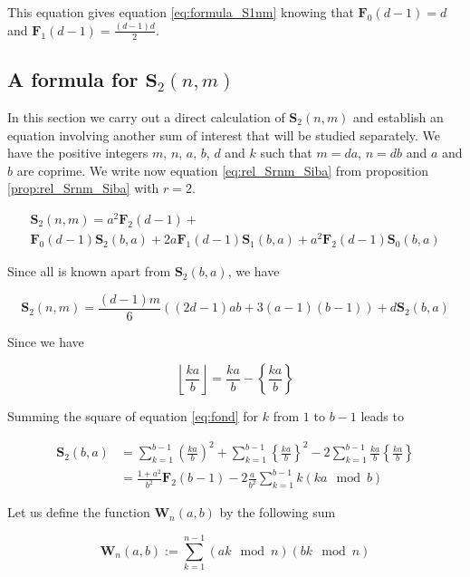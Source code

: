 \documentclass{article}%
\newcommand{\ENT}[1]{ \left\lfloor #1 \right\rfloor}
\newcommand{\FRA}[1]{\left\{ #1 \right\}}
\newcommand{\SUMS}[3]{\mathbf{S}_{#1}\left(#2,#3\right)}
\newcommand{\SUMW}[2]{\mathbf{W}_{#1}\left(#2\right)}
\newcommand{\SUMF}[2]{\mathbf{F}_{#1}\left(#2\right)}
\begin{document}
This equation gives equation \ref{eq:formula_S1nm} knowing that $\SUMF{0}{d-1}=d$ and $\SUMF{1}{d-1}=\frac{(d-1)d}{2}$.

\subsection{A formula for $\SUMS{2}{n}{m}$} 

In this section we carry out a direct calculation of $\SUMS{2}{n}{m}$ and establish an equation involving another sum of interest that will be studied separately. We have the positive integers $m$, $n$, $a$, $b$, $d$ and $k$ such that $m=da$, $n=db$ and $a$ and $b$ are coprime. We write now equation \ref{eq:rel_Srnm_Siba} from proposition \ref{prop:rel_Srnm_Siba} with $r=2$.

\begin{multline*}
\SUMS{2}{n}{m} = a^2\SUMF{2}{d-1} + \\ \SUMF{0}{d-1}\SUMS{2}{b}{a} + 2a\SUMF{1}{d-1}\SUMS{1}{b}{a} + a^2\SUMF{2}{d-1}\SUMS{0}{b}{a}
\end{multline*}

Since all is known apart from $\SUMS{2}{b}{a}$, we have

\begin{equation*} \label{eq:rel_S2np_S2ba}
\SUMS{2}{n}{m} = \frac{(d-1)m}{6}\left((2d-1)ab+3(a-1)(b-1)\right)+d\SUMS{2}{b}{a}
\end{equation*}

Since we have

\begin{equation} \label{eq:fond}
\ENT{\frac{ka}{b}} = \frac{ka}{b} - \FRA{\frac{ka}{b}}
\end{equation}

Summing the square of equation \ref{eq:fond} for $k$ from $1$ to $b-1$ leads to

\begin{align*}
\SUMS{2}{b}{a} 
&= \sum_{k=1}^{b-1}\left({\frac{ka}{b}}\right)^2 + \sum_{k=1}^{b-1}\FRA{\frac{ka}{b}}^2 - 2 \sum_{k=1}^{b-1}\frac{ka}{b}\FRA{\frac{ka}{b}} \\
&= \frac{1+a^2}{b^2}\SUMF{2}{b-1}-2\frac{a}{b^2}\sum_{k=1}^{b-1}k(ka\mod b)
\end{align*}

Let us define the function $\SUMW{n}{a,b}$ by the following sum

\begin{equation} \label{eq:Wnab}
\SUMW{n}{a,b} :=\sum_{k=1}^{n-1}(ak\mod n)(bk\mod n)
\end{equation}
\end{document}

